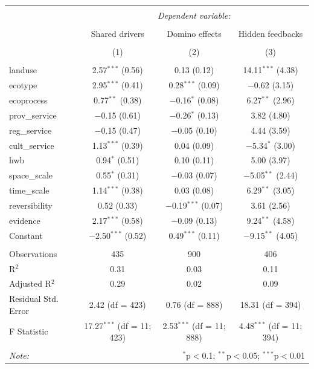 \documentclass[9pt,]{article}
\begin{document}
\begin{tabular}{@{\extracolsep{5pt}}lccc} 
\\[-1.8ex]\hline 
\hline \\[-1.8ex] 
 & \multicolumn{3}{c}{\textit{Dependent variable:}} \\ 
\cline{2-4} 
\\[-1.8ex] & Shared drivers & Domino effects & Hidden feedbacks \\ 
\\[-1.8ex] & (1) & (2) & (3)\\ 
\hline \\[-1.8ex] 
 landuse & 2.57$^{***}$ (0.56) & 0.13 (0.12) & 14.11$^{***}$ (4.38) \\ 
  ecotype & 2.95$^{***}$ (0.41) & 0.28$^{***}$ (0.09) & $-$0.62 (3.15) \\ 
  ecoprocess & 0.77$^{**}$ (0.38) & $-$0.16$^{*}$ (0.08) & 6.27$^{**}$ (2.96) \\ 
  prov\_service & $-$0.15 (0.61) & $-$0.26$^{*}$ (0.13) & 3.82 (4.80) \\ 
  reg\_service & $-$0.15 (0.47) & $-$0.05 (0.10) & 4.44 (3.59) \\ 
  cult\_service & 1.13$^{***}$ (0.39) & 0.04 (0.09) & $-$5.34$^{*}$ (3.00) \\ 
  hwb & 0.94$^{*}$ (0.51) & 0.10 (0.11) & 5.00 (3.97) \\ 
  space\_scale & 0.55$^{*}$ (0.31) & $-$0.03 (0.07) & $-$5.05$^{**}$ (2.44) \\ 
  time\_scale & 1.14$^{***}$ (0.38) & 0.03 (0.08) & 6.29$^{**}$ (3.05) \\ 
  reversibility & 0.52 (0.33) & $-$0.19$^{***}$ (0.07) & 3.61 (2.56) \\ 
  evidence & 2.17$^{***}$ (0.58) & $-$0.09 (0.13) & 9.24$^{**}$ (4.58) \\ 
  Constant & $-$2.50$^{***}$ (0.52) & 0.49$^{***}$ (0.11) & $-$9.15$^{**}$ (4.05) \\ 
 \hline \\[-1.8ex] 
Observations & 435 & 900 & 406 \\ 
R$^{2}$ & 0.31 & 0.03 & 0.11 \\ 
Adjusted R$^{2}$ & 0.29 & 0.02 & 0.09 \\ 
Residual Std. Error & 2.42 (df = 423) & 0.76 (df = 888) & 18.31 (df = 394) \\ 
F Statistic & 17.27$^{***}$ (df = 11; 423) & 2.53$^{***}$ (df = 11; 888) & 4.48$^{***}$ (df = 11; 394) \\ 
\hline 
\hline \\[-1.8ex] 
\textit{Note:}  & \multicolumn{3}{r}{$^{*}$p$<$0.1; $^{**}$p$<$0.05; $^{***}$p$<$0.01} \\ 
\end{tabular}
\end{document}
